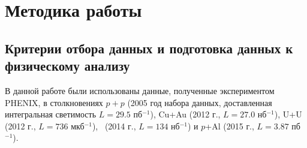 \chapter{Методика работы} \label{chapt3}

\section{Критерии отбора данных и подготовка данных к физическому анализу} \label{sect3_cuts}
В данной работе были использованы данные, полученные экспериментом PHENIX, в столкновениях $p+p$ (2005 год набора данных, доставленная интегральная светимость $L=29.5$ пб$^{-1}$), Cu+Au (2012 г., $L=27.0$ нб$^{-1}$), U+U (2012 г., $L=736$ мкб$^{-1}$), \heau \ (2014 г., $L=134$ нб$^{-1}$) и $p$+Al (2015 г., $L=3.87$ пб$^{-1}$).


